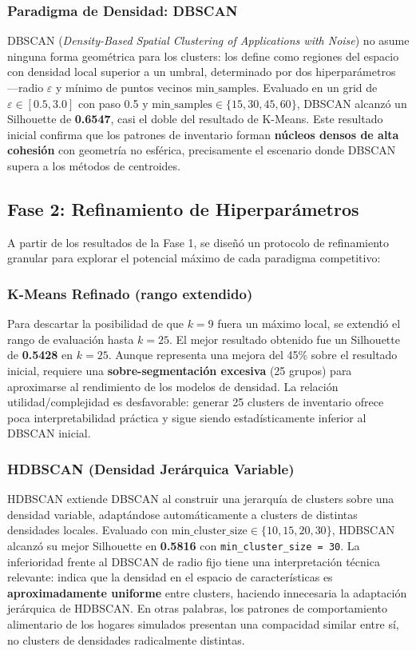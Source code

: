 \documentclass[12pt,a4paper]{article}
\newcommand{\metric}[1]{\textcolor{metricblue}{\textbf{#1}}}
\newcommand{\code}[1]{\texttt{\small #1}}
\begin{document}
\subsubsection{Paradigma de Densidad: DBSCAN}

DBSCAN (\textit{Density-Based Spatial Clustering of Applications with Noise}) no asume ninguna forma geométrica para los clusters: los define como regiones del espacio con densidad local superior a un umbral, determinado por dos hiperparámetros —radio $\varepsilon$ y mínimo de puntos vecinos $\text{min\_samples}$. Evaluado en un grid de $\varepsilon \in [0.5, 3.0]$ con paso 0.5 y $\text{min\_samples} \in \{15, 30, 45, 60\}$, DBSCAN alcanzó un Silhouette de \metric{0.6547}, casi el doble del resultado de K-Means. Este resultado inicial confirma que los patrones de inventario forman \textbf{núcleos densos de alta cohesión} con geometría no esférica, precisamente el escenario donde DBSCAN supera a los métodos de centroides.

\subsection{Fase 2: Refinamiento de Hiperparámetros}

A partir de los resultados de la Fase 1, se diseñó un protocolo de refinamiento granular para explorar el potencial máximo de cada paradigma competitivo:

\subsubsection{K-Means Refinado (rango extendido)}

Para descartar la posibilidad de que $k = 9$ fuera un máximo local, se extendió el rango de evaluación hasta $k = 25$. El mejor resultado obtenido fue un Silhouette de \metric{0.5428} en $k = 25$. Aunque representa una mejora del 45\% sobre el resultado inicial, requiere una \textbf{sobre-segmentación excesiva} (25 grupos) para aproximarse al rendimiento de los modelos de densidad. La relación utilidad/complejidad es desfavorable: generar 25 clusters de inventario ofrece poca interpretabilidad práctica y sigue siendo estadísticamente inferior al DBSCAN inicial.

\subsubsection{HDBSCAN (Densidad Jerárquica Variable)}

HDBSCAN extiende DBSCAN al construir una jerarquía de clusters sobre una densidad variable, adaptándose automáticamente a clusters de distintas densidades locales. Evaluado con $\text{min\_cluster\_size} \in \{10, 15, 20, 30\}$, HDBSCAN alcanzó su mejor Silhouette en \metric{0.5816} con \code{min\_cluster\_size = 30}. La inferioridad frente al DBSCAN de radio fijo tiene una interpretación técnica relevante: indica que la densidad en el espacio de características es \textbf{aproximadamente uniforme} entre clusters, haciendo innecesaria la adaptación jerárquica de HDBSCAN. En otras palabras, los patrones de comportamiento alimentario de los hogares simulados presentan una compacidad similar entre sí, no clusters de densidades radicalmente distintas.
\end{document}
